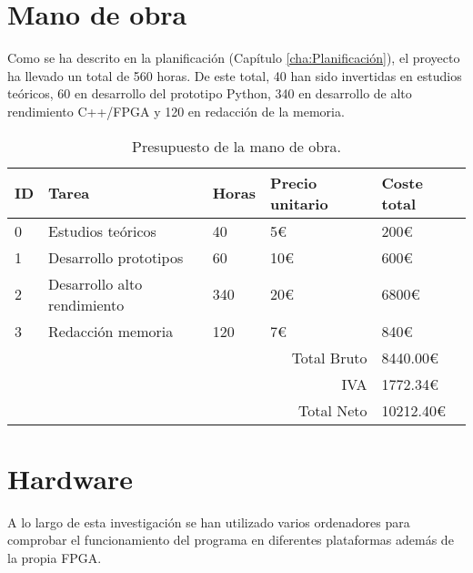 
\section{Mano de obra}

Como se ha descrito en la planificación (Capítulo \ref{cha:Planificación}),
el proyecto ha llevado un total de 560 horas.
De este total, 40 han sido invertidas en estudios teóricos,
60 en desarrollo del prototipo Python,
340 en desarrollo de alto rendimiento C++/FPGA y
120 en redacción de la memoria.

\begin{center}
    \begin{table}[h]
        \centering
        \begin{tabular}{ l | l l l l }
            \hline
            ID & Tarea & Horas & Precio unitario & Coste total \\
            \hline
            0 & Estudios teóricos & 40 & 5€ & 200€ \\
            1 & Desarrollo prototipos & 60 & 10€ & 600€ \\
            2 & Desarrollo alto rendimiento & 340 & 20€ & 6800€ \\
            3 & Redacción memoria & 120 & 7€ & 840€ \\
            \hline
            \multicolumn{4}{r}{Total Bruto} & 8440.00€ \\
            \multicolumn{4}{r}{IVA} & 1772.34€ \\
            \multicolumn{4}{r}{Total Neto} & 10212.40€ \\
            \hline
        \end{tabular}
        \caption{Presupuesto de la mano de obra.}
    \end{table}
\end{center}

\pagebreak
\section{Hardware}

A lo largo de esta investigación se han utilizado varios ordenadores
para comprobar el funcionamiento del programa en diferentes plataformas
además de la propia FPGA.

